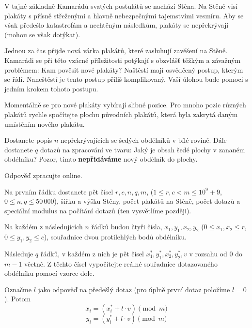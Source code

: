 





V tajné základně Kamarádů svatých postulátů se nachází Stěna. Na Stěně visí
plakáty s přísně střeženými a hlavně nebezpečnými tajemstvími vesmíru. Aby se
však předešlo katastrofám a nechtěným následkům, plakáty se nepřekrývají (mohou
se však dotýkat).

Jednou za čas přijde nová várka plakátů, které zasluhují zavěšení na Stěně.
Kamarádi se při této vzácné příležitosti potýkají s obzvlášť těžkým a závažným
problémem: Kam pověsit nové plakáty? Naštěstí mají osvědčený postup, kterým se
řídí. Naneštěstí je tento postup příliš komplikovaný. Vaší úlohou bude pomoci
s jedním krokem tohoto postupu.

Momentálně se pro nové plakáty vybírají slibné pozice. Pro mnoho pozic různých
plakátů rychle spočítejte plochu původních plakátů, která byla zakrytá daným
umístěním nového plakátu.


Dostanete popis $n$ nepřekrývajících se šedých obdélníků v bílé rovině. Dále
dostanete $q$ dotazů na zpracování ve tvaru: Jaký je obsah šedé plochy
v zananém obdélníku? Pozor, tímto \textbf{nepřidáváme} nový obdélník do plochy.

Odpověď zpracujte online.


Na prvním řádku dostanete pět čísel $r, c, n, q, m$, ($1 \leq r, c < m \leq 10^9 + 9$, $0 \leq n,q \leq 50\,000$),
šířku a výšku Stěny, počet plakátů na Stěně, počet dotazů a speciální modulus na
počítání dotazů (ten vysvětlíme později).

Na každém z následujících $n$ řádků budou čtyři čísla, $x_1, y_1, x_2, y_2$ ($0 \leq x_1, x_2 \leq r$,
$0 \leq y_1, y_2 \leq c$), souřadnice dvou protilehlých bodů obdélníku.

Následuje $q$ řádků, v každém z nich je pět čísel $x_1^*, y_1^*, x_2^*, y_2^*, v$
v rozsahu od $0$ do $m - 1$ včetně. Z těchto čísel vypočítejte reálné souřadnice
dotazovaného obdélníku pomocí vzorce dole.

Označme $l$ jako odpověď na předešlý dotaz (pro úplně první dotaz položíme $l=0$). Potom
$$x_i = (x_i^* + l \cdot v) \pmod m$$
$$y_i = (y_i^* + l \cdot v) \pmod m$$

